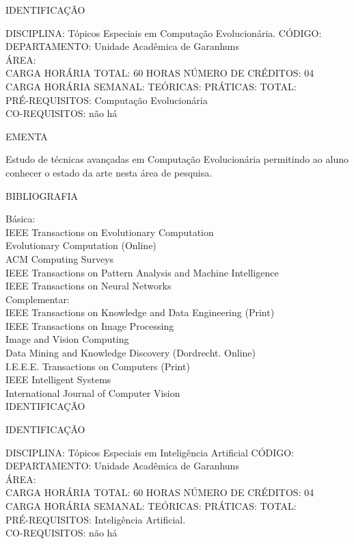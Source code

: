 \documentclass[
	12pt,				%
	openright,			%
  oneside,     %
	a4paper,			%
	chapter=TITLE,		%
	english,			%
	french,				%
	spanish,			%
	brazil				%
	]{abntex2}
\begin{document}
\begin{apendicesenv}
\newpage IDENTIFICAÇÃO

DISCIPLINA: Tópicos Especiais em Computação Evolucionária. CÓDIGO:\\ 
DEPARTAMENTO: Unidade Acadêmica de Garanhuns\\ 
ÁREA: \\
CARGA HORÁRIA TOTAL: 60 HORAS NÚMERO DE CRÉDITOS: 04\\
CARGA HORÁRIA SEMANAL: TEÓRICAS: PRÁTICAS: TOTAL: \\
PRÉ-REQUISITOS: Computação Evolucionária\\
CO-REQUISITOS: não há

EMENTA 

Estudo de técnicas avançadas em Computação Evolucionária permitindo ao
aluno conhecer o estado da arte nesta área de pesquisa.

BIBLIOGRAFIA 

Básica:\\
IEEE Transactions on Evolutionary Computation\\
Evolutionary Computation (Online)\\
ACM Computing Surveys\\
IEEE Transactions on Pattern Analysis and Machine Intelligence\\
IEEE Transactions on Neural Networks\\
Complementar:\\
IEEE Transactions on Knowledge and Data Engineering (Print)\\
IEEE Transactions on Image Processing\\
Image and Vision Computing\\
Data Mining and Knowledge Discovery (Dordrecht. Online)\\
I.E.E.E. Transactions on Computers (Print)\\
IEEE Intelligent Systems\\
International Journal of Computer Vision\\

\newpage IDENTIFICAÇÃO

IDENTIFICAÇÃO 

DISCIPLINA: Tópicos Especiais em Inteligência Artificial CÓDIGO:\\ 
DEPARTAMENTO: Unidade Acadêmica de Garanhuns\\
ÁREA: \\
CARGA HORÁRIA TOTAL: 60 HORAS NÚMERO DE CRÉDITOS: 04\\
CARGA HORÁRIA SEMANAL: TEÓRICAS: PRÁTICAS: TOTAL: \\
PRÉ-REQUISITOS: Inteligência Artificial.\\
CO-REQUISITOS: não há


\end{apendicesenv}
\end{document}
